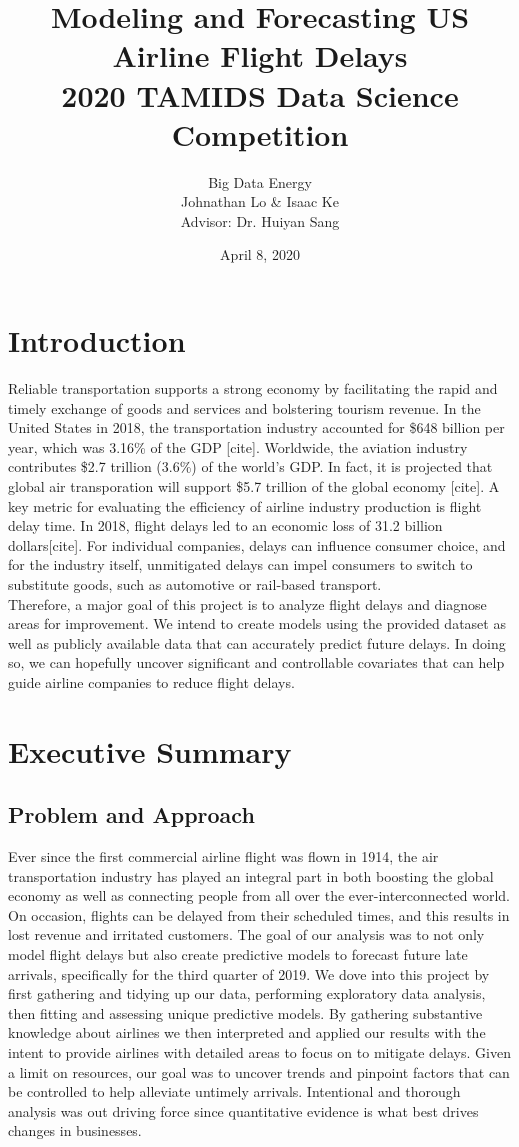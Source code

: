 \documentclass[12pt, a4paper, openany]{book}
\title{Modeling and Forecasting US Airline Flight Delays\\2020 TAMIDS Data Science Competition}
\author{Big Data Energy\\Johnathan Lo \& Isaac Ke\\Advisor: Dr. Huiyan Sang}
\date{April 8, 2020}
\newcommand\tab[1][1cm]{\hspace*{#1}}
\begin{document}
\pagestyle{empty}
\maketitle
  \tableofcontents \thispagestyle{empty}
\pagestyle{empty}
\chapter{Introduction}
\setcounter{page}{1}

\tab Reliable transportation supports a strong economy by facilitating the rapid and timely exchange of goods and services and bolstering tourism revenue. In the United States in 2018, the transportation industry accounted for \$648 billion per year, which was 3.16\% of the GDP [cite]. Worldwide, the aviation industry contributes \$2.7 trillion (3.6\%) of the world's GDP. In fact, it is projected that global air transporation will support \$5.7 trillion of the global economy [cite]. A key metric for evaluating the efficiency of airline industry production is flight delay time. In 2018, flight delays led to an economic loss of 31.2 billion dollars[cite]. For individual companies, delays can influence consumer choice, and for the industry itself, unmitigated delays can impel consumers to switch to substitute goods, such as automotive or rail-based transport. \\
\tab Therefore, a major goal of this project is to analyze flight delays and diagnose areas for improvement. We intend to create models using the provided dataset as well as publicly available data that can accurately predict future delays. In doing so, we can hopefully uncover significant and controllable covariates that can help guide airline companies to reduce flight delays. 
\chapter{Executive Summary}
	\section{Problem and Approach}
\tab Ever since the first commercial airline flight was flown in 1914, the air transportation industry has played an integral part in both boosting the global economy as well as connecting people from all over the ever-interconnected world. On occasion, flights can be delayed from their scheduled times, and this results in lost revenue and irritated customers. The goal of our analysis was to not only model flight delays but also create predictive models to forecast future late arrivals, specifically for the third quarter of 2019. We dove into this project by first gathering and tidying up our data, performing exploratory data analysis, then fitting and assessing unique predictive models. By gathering substantive knowledge about airlines we then interpreted and applied our results with the intent to provide airlines with detailed areas to focus on to mitigate delays. Given a limit on resources, our goal was to uncover trends and pinpoint factors that can be controlled to help alleviate untimely arrivals. Intentional and thorough analysis was out driving force since quantitative evidence is what best drives changes in businesses.
\end{document}
